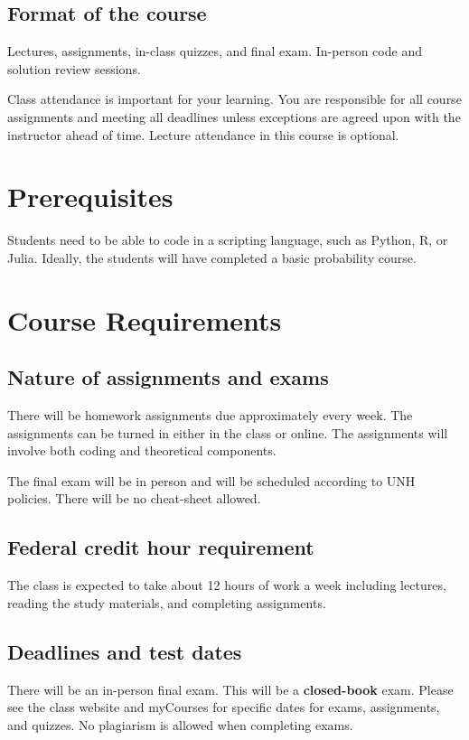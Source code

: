 \documentclass[11pt]{article}
\begin{document}
\subsection{Format of the course}
Lectures, assignments, in-class quizzes, and final exam. In-person code and solution review sessions.

Class attendance is important for your learning. You are responsible for all course
assignments and meeting all deadlines unless exceptions are agreed upon with the
instructor ahead of time. Lecture attendance in this course is optional.

\section{Prerequisites}

Students need to be able to code in a scripting language, such as Python, R, or Julia. Ideally, the students will have completed a basic probability course.

\section{Course Requirements}

\subsection{Nature of assignments and exams}

There will be homework assignments due approximately every week. The assignments can be turned in either in the class or online. The assignments will involve both coding and theoretical components.

The final exam will be in person and will be scheduled according to UNH policies. There will be no cheat-sheet allowed.

\subsection{Federal credit hour requirement}

The class is expected to take about 12 hours of work a week including lectures, reading the study materials, and completing assignments.

\subsection{Deadlines and test dates}

There will be an in-person final exam. This will be a \textbf{closed-book} exam. Please see the class website and myCourses for specific dates for exams, assignments, and quizzes. No plagiarism is allowed when completing exams. 
\end{document}
